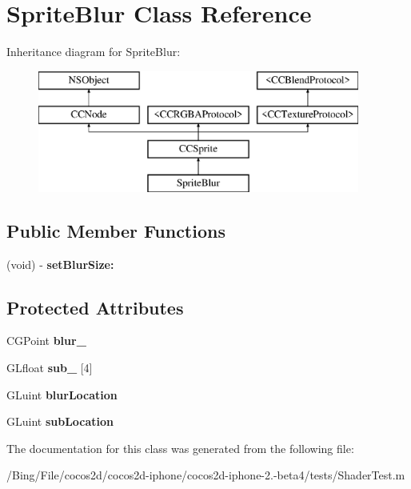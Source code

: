 \hypertarget{interface_sprite_blur}{\section{Sprite\-Blur Class Reference}
\label{interface_sprite_blur}
}
Inheritance diagram for Sprite\-Blur\-:\begin{figure}[H]
\begin{center}
\leavevmode
\includegraphics[height=4.000000cm]{interface_sprite_blur}
\end{center}
\end{figure}
\subsection*{Public Member Functions}
\begin{DoxyCompactItemize}
\item 
\hypertarget{interface_sprite_blur_a68cce03d75dd272fd66110db1c73e4a1}{(void) -\/ {\bfseries set\-Blur\-Size\-:}}\label{interface_sprite_blur_a68cce03d75dd272fd66110db1c73e4a1}

\end{DoxyCompactItemize}
\subsection*{Protected Attributes}
\begin{DoxyCompactItemize}
\item 
\hypertarget{interface_sprite_blur_aa4ef63fe838619e78b39c3130fc3af4e}{C\-G\-Point {\bfseries blur\-\_\-}}\label{interface_sprite_blur_aa4ef63fe838619e78b39c3130fc3af4e}

\item 
\hypertarget{interface_sprite_blur_ad8bb6857d1745f2bed539046f3db8d45}{G\-Lfloat {\bfseries sub\-\_\-} \mbox{[}4\mbox{]}}\label{interface_sprite_blur_ad8bb6857d1745f2bed539046f3db8d45}

\item 
\hypertarget{interface_sprite_blur_a10eff9f1d06d18e604eff1064ce9cf72}{G\-Luint {\bfseries blur\-Location}}\label{interface_sprite_blur_a10eff9f1d06d18e604eff1064ce9cf72}

\item 
\hypertarget{interface_sprite_blur_a67024decc97de2d9c971bd1a2fd19c77}{G\-Luint {\bfseries sub\-Location}}\label{interface_sprite_blur_a67024decc97de2d9c971bd1a2fd19c77}

\end{DoxyCompactItemize}


The documentation for this class was generated from the following file\-:\begin{DoxyCompactItemize}
\item 
/\-Bing/\-File/cocos2d/cocos2d-\/iphone/cocos2d-\/iphone-\/2.-\/beta4/tests/Shader\-Test.\-m\end{DoxyCompactItemize}
